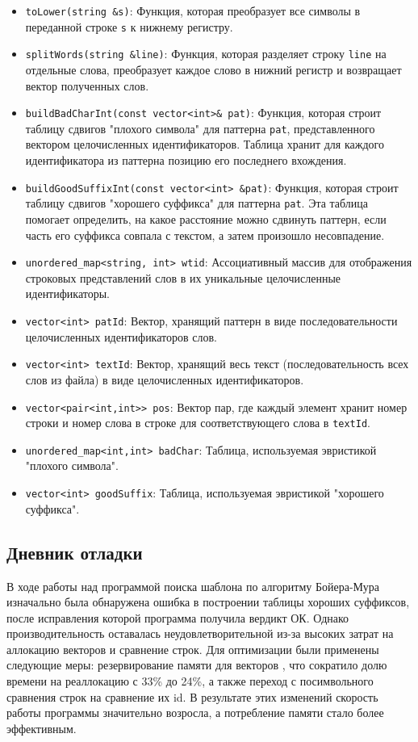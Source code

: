 \documentclass[12pt]{article}
\begin{document}
\begin{itemize}
    \item \texttt{toLower(string \&s)}: Функция, которая преобразует все символы в переданной строке \texttt{s} к нижнему регистру.
    \item \texttt{splitWords(string \&line)}: Функция, которая разделяет строку \texttt{line} на отдельные слова, преобразует каждое слово в нижний регистр и возвращает вектор полученных слов.
    \item \texttt{buildBadCharInt(const vector<int>\& pat)}: Функция, которая строит таблицу сдвигов "плохого символа" для паттерна \texttt{pat}, представленного вектором целочисленных идентификаторов. Таблица хранит для каждого идентификатора из паттерна позицию его последнего вхождения.
    \item \texttt{buildGoodSuffixInt(const vector<int> \&pat)}: Функция, которая строит таблицу сдвигов "хорошего суффикса" для паттерна \texttt{pat}. Эта таблица помогает определить, на какое расстояние можно сдвинуть паттерн, если часть его суффикса совпала с текстом, а затем произошло несовпадение.
    \item \texttt{unordered\_map<string, int> wtid}: Ассоциативный массив для отображения строковых представлений слов в их уникальные целочисленные идентификаторы.
    \item \texttt{vector<int> patId}: Вектор, хранящий паттерн в виде последовательности целочисленных идентификаторов слов.
    \item \texttt{vector<int> textId}: Вектор, хранящий весь текст (последовательность всех слов из файла) в виде целочисленных идентификаторов.
    \item \texttt{vector<pair<int,int>> pos}: Вектор пар, где каждый элемент хранит номер строки и номер слова в строке для соответствующего слова в \texttt{textId}.
    \item \texttt{unordered\_map<int,int> badChar}: Таблица, используемая эвристикой "плохого символа".
    \item \texttt{vector<int> goodSuffix}: Таблица, используемая эвристикой "хорошего суффикса".
\end{itemize}

\subsection*{Дневник отладки}

В ходе работы над программой поиска шаблона по алгоритму Бойера-Мура изначально 
была обнаружена ошибка в построении таблицы хороших суффиксов, после исправления 
которой программа получила вердикт ОК. Однако производительность оставалась неудовлетворительной 
из-за высоких затрат на аллокацию векторов и сравнение строк. Для оптимизации были применены следующие меры: 
резервирование памяти для векторов , что сократило долю времени на реаллокацию с 33\% до 24\%, а также переход с 
посимвольного сравнения строк на сравнение их id. В результате этих изменений скорость работы программы значительно возросла, 
а потребление памяти стало более эффективным.
\end{document}
